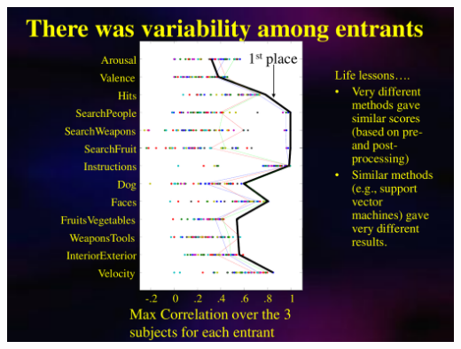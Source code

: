 \begin{frame}
\begin{center}
\includegraphics[height=0.7\textwidth]{pbaic2007_2}
\end{center}
\end{frame}



